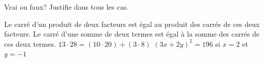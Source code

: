 %
%
Vrai ou faux? Justifie dans tous les cas.
  \begin{tasks}
    \task Le carré d'un produit de deux facteurs est égal au produit des carrés de ces deux facteurs.
    \task Le carré d'une somme de deux termes est égal à la somme des carrés de ces deux termes.
    \task $13\cdot 28=\left(10\cdot 20\right) + \left(3\cdot 8\right)$
    \task $\left(3x+2y\right)^2=196$ si $x=2$ et $y=-1$
  \end{tasks}
